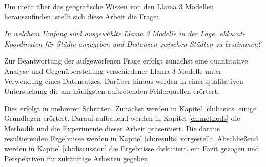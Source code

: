
Um mehr über das geografische Wissen von den Llama 3 Modellen herauszufinden, stellt sich diese Arbeit die Frage:

\begin{center}
    \itshape
    In welchem Umfang sind ausgewählte Llama 3 Modelle in der Lage, akkurate Koordinaten für Städte anzugeben und Distanzen zwischen Städten zu bestimmen?
\end{center}

Zur Beantwortung der aufgeworfenen Frage erfolgt zunächst eine quantitative Analyse und Gegenüberstellung verschiedener Llama 3 Modelle unter Verwendung eines Datensatzes. Darüber hinaus werden in einer qualitativen Untersuchung die am häufigsten auftretenden Fehlerquellen erörtert.

Dies erfolgt in mehreren Schritten. Zunächst werden in Kapitel \ref{ch:basics} einige Grundlagen erörtert. Darauf aufbauend werden in Kapitel \ref{ch:methods} die Methodik und die Experimente dieser Arbeit präsentiert. Die daraus resultierenden Ergebnisse werden in Kapitel \ref{ch:results} vorgestellt.
Abschließend werden in Kapitel \ref{ch:discussion} die Ergebnisse diskutiert, ein Fazit gezogen und Perspektiven für zukünftige Arbeiten gegeben.